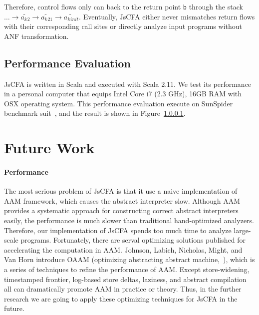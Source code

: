 \documentclass{article}
\begin{document}
Therefore, control flows only can back to the return point \verb|b| through the stack $\dots \to \widetilde{a_k{}_{2}} \to \widetilde{a_k{}_{21}} \to \widetilde{a_k{}_{init}}$. Eventually, JsCFA either never mismatches return flows with their corresponding call sites or directly analyze input programs without ANF transformation.

\subsection{Performance Evaluation}
\label{sub:Performance Evaluation}
JsCFA is written in Scala and executed with Scala 2.11.
We test its performance in a personal computer that equips Intel Core i7 (2.3 GHz), 16GB RAM with OSX operating system.
This performance evaluation execute on SunSpider benchmark suit~\cite{sunspider}, and the result is shown in Figure~\ref{}.

\section{Future Work}
\label{sec:Future}
\paragraph{Performance}
The most serious problem of JsCFA is that it use a naive implementation of AAM framework, which causes the abstract interpreter slow.
Although AAM provides a systematic approach for constructing correct abstract interpreters easily, the performance is much slower than traditional hand-optimized analyzers.
Therefore, our implementation of JsCFA spends too much time to analyze large-scale programs.
Fortunately, there are serval optimizing solutions published for accelerating the computation in AAM\@.
Johnson, Labich, Nicholas, Might, and Van Horn introduce OAAM (optimizing abstracting abstract machine,~\cite{johnson2013optimizing}), which is a series of techniques to refine the performance of AAM\@.
Except store-widening, timestamped frontier, log-based store deltas, laziness, and abstract compilation all can dramatically promote AAM in practice or theory.
Thus, in the further research we are going to apply these optimizing techniques for JsCFA in the future.

\clearpage


\end{document}
